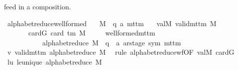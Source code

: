 \begin{isabellebody}
\begin{isamarkuptext}
  feed  in a composition.%
\end{isamarkuptext}\isamarkuptrue%
\isamarkupfalse%
\ alphabet{\isacharunderscore}{\kern0pt}reduce{\isacharunderscore}{\kern0pt}well{\isacharunderscore}{\kern0pt}formed{\isacharcolon}{\kern0pt}\isanewline
\ \ \ M\ {\isacharcolon}{\kern0pt}{\isacharcolon}{\kern0pt}\ {\isachardoublequoteopen}{\isacharparenleft}{\kern0pt}{\isacharprime}{\kern0pt}q{\isacharcomma}{\kern0pt}\ {\isacharprime}{\kern0pt}a{\isacharparenright}{\kern0pt}\ mttm{\isachardoublequoteclose}\isanewline
\ \ \ valM{\isacharcolon}{\kern0pt}\ {\isachardoublequoteopen}valid{\isacharunderscore}{\kern0pt}mttm\ M{\isachardoublequoteclose}\isanewline
\ \ \ \ \ \ \ cardG{\isacharcolon}{\kern0pt}\ {\isachardoublequoteopen}card\ {\isacharparenleft}{\kern0pt}{\isasymGamma}{\isacharunderscore}{\kern0pt}tm\ M{\isacharparenright}{\kern0pt}\ {\isasymge}\ {}{\isachardoublequoteclose}\isanewline
\ \ \ {\isachardoublequoteopen}well{\isacharunderscore}{\kern0pt}formed{\isacharunderscore}{\kern0pt}mttm\isanewline
\ \ \ \ \ \ \ \ \ \ \ {\isacharparenleft}{\kern0pt}alphabet{\isacharunderscore}{\kern0pt}reduce\ M\ {\isacharcolon}{\kern0pt}{\isacharcolon}{\kern0pt}\ {\isacharparenleft}{\kern0pt}{\isacharprime}{\kern0pt}q\ {\isasymtimes}\ {\isacharprime}{\kern0pt}a\ ar{\isacharunderscore}{\kern0pt}stage{\isacharcomma}{\kern0pt}\ sym{}{\isacharparenright}{\kern0pt}\ mttm{\isacharparenright}{\kern0pt}{\isachardoublequoteclose}\isanewline
%
\isadelimproof
%
\endisadelimproof
%
\isatagproof
{}\isamarkupfalse%
\ {\isacharminus}{\kern0pt}\isanewline
\ \ \isamarkupfalse%
\ v{\isacharcolon}{\kern0pt}\ {\isachardoublequoteopen}valid{\isacharunderscore}{\kern0pt}mttm\ {\isacharparenleft}{\kern0pt}alphabet{\isacharunderscore}{\kern0pt}reduce\ M{\isacharparenright}{\kern0pt}{\isachardoublequoteclose}\ \isamarkupfalse%
\ {\isacharparenleft}{\kern0pt}rule\ alphabet{\isacharunderscore}{\kern0pt}reduce{\isacharunderscore}{\kern0pt}wf{\isacharbrackleft}{\kern0pt}OF\ valM\ cardG{\isacharbrackright}{\kern0pt}{\isacharparenright}{\kern0pt}\isanewline
\ \ \isamarkupfalse%
\ lu{\isacharcolon}{\kern0pt}\ {\isachardoublequoteopen}le{\isacharunderscore}{\kern0pt}unique\ {\isacharparenleft}{\kern0pt}alphabet{\isacharunderscore}{\kern0pt}reduce\ M{\isacharparenright}{\kern0pt}{\isachardoublequoteclose}\ \isamarkupfalse%

\end{isabellebody}
